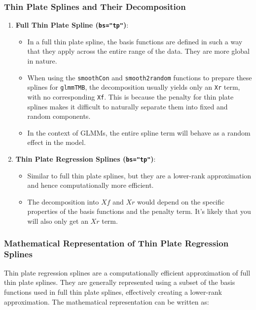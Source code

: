 \subsubsection{Thin Plate Splines and Their Decomposition}

\begin{enumerate}
    \item \textbf{Full Thin Plate Spline (\texttt{bs="tp"})}:
    \begin{itemize}
        \item In a full thin plate spline, the basis functions are defined in such a way that they apply across the entire range of the data. They are more global in nature.
        \item When using the \texttt{smoothCon} \citep[pp.~327]{wood2017} and \texttt{smooth2random} \cite{mgcvmanual} functions to prepare these splines for \texttt{glmmTMB}, the decomposition usually yields only an \texttt{Xr} term, with no corresponding \texttt{Xf}.
 This is because the penalty for thin plate splines makes it difficult to naturally separate them into fixed and random components.
        \item In the context of GLMMs, the entire spline term will behave as a random effect in the model.
    \end{itemize}
    
    \item \textbf{Thin Plate Regression Splines (\texttt{bs="tp"})}:
    \begin{itemize}
        \item Similar to full thin plate splines, but they are a lower-rank approximation and hence computationally more efficient.
        \item The decomposition into \(Xf\) and \(Xr\) would depend on the specific properties of the basis functions and the penalty term. It's likely that you will also only get an \(Xr\) term.
    \end{itemize}
\end{enumerate}


\subsubsection*{Mathematical Representation of Thin Plate Regression Splines}

Thin plate regression splines are a computationally efficient approximation of full thin plate splines. They are generally represented using a subset of the basis functions used in full thin plate splines, effectively creating a lower-rank approximation. The mathematical representation can be written as:

